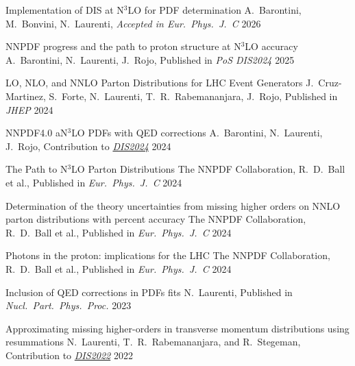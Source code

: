 
\begin{cvhonors}

    \cvhonor
    {Implementation of DIS at N$^3$LO for PDF determination} %
    {A.\ Barontini, M.\ Bonvini, N.\ Laurenti, \emph{Accepted in Eur.\ Phys.\ J.\ C}} %
    {\href{https://inspirehep.net/literature/3172533}{\inspire}}
    {2026}

    \cvhonor
    {NNPDF progress and the path to proton structure at N$^3$LO accuracy} %
    {A.~Barontini, N.~Laurenti, J.~Rojo, Published in \emph{PoS DIS2024}} %
    {\href{https://inspirehep.net/literature/2865538}{\inspire}}
    {2025}

    \cvhonor
    {LO, NLO, and NNLO Parton Distributions for LHC Event Generators} %
    {J.~Cruz-Martinez, S.~Forte, N.~Laurenti, T.~R.~Rabemananjara, J.~Rojo, Published in \emph{JHEP}} %
    {\href{https://inspirehep.net/literature/2800507}{\inspire}}
    {2024}

    \cvhonor
    {NNPDF4.0 aN$^3$LO PDFs with QED corrections} %
    {A.~Barontini, N.~Laurenti, J.~Rojo, Contribution to \emph{\href{https://inspirehep.net/conferences/2667502?ui-citation-summary=true}{DIS2024}}} %
    {\href{https://inspirehep.net/literature/2794583}{\inspire}}
    {2024}
    
    \cvhonor
    {The Path to N$^3$LO Parton Distributions} %
    {The NNPDF Collaboration, R.~D.~Ball et al., Published in \emph{Eur.\ Phys.\ J.\ C}} %
    {\href{https://inspirehep.net/literature/2762925}{\inspire}}
    {2024}
    
    \cvhonor
    {Determination of the theory uncertainties from missing higher orders on NNLO parton distributions with percent accuracy} %
    {The NNPDF Collaboration, R.~D.~Ball et al., Published in \emph{Eur.\ Phys.\ J.\ C}} %
    {\href{https://inspirehep.net/literature/2749502}{\inspire}}
    {2024}
    
    \cvhonor
    {Photons in the proton: implications for the LHC} %
    {The NNPDF Collaboration, R.~D.~Ball et al., Published in \emph{Eur.\ Phys.\ J.\ C}} %
    {\href{https://inspirehep.net/literature/2747770}{\inspire}}
    {2024}

    \cvhonor
    {Inclusion of QED corrections in PDFs ﬁts}
    {N.~Laurenti, Published in \textit{Nucl.\ Part.\ Phys.\ Proc.}}
    {\href{https://inspirehep.net/literature/2780465}{\inspire}}
    {2023}
    
    \cvhonor
    {Approximating missing higher-orders in transverse momentum distributions using resummations}
    {N.~Laurenti, T.~R.~Rabemananjara, and R.~Stegeman, Contribution to \emph{\href{https://inspirehep.net/conferences/1914506?ui-citation-summary=true}{DIS2022}}}
    {\href{https://inspirehep.net/literature/2122473}{\inspire}}
    {2022}

\end{cvhonors}
